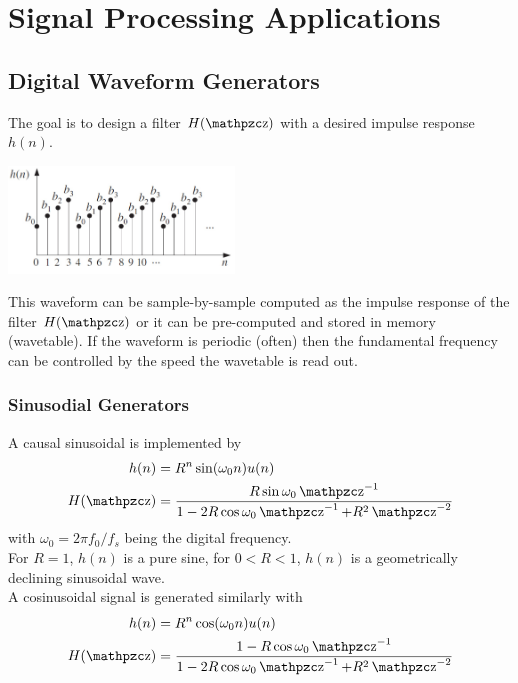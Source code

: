 \section{Signal Processing Applications}
\subsection{Digital Waveform Generators}

The goal is to design a filter $H(\z)$ with a desired impulse response $h(n)$.

\begin{center}
	\includegraphics[width=6cm]{images/SignProcApp_DigWaveFormGenerator.jpg}
\end{center}
This waveform can be sample-by-sample computed as the impulse response of the filter $H(\z)$ or it can be pre-computed and stored in memory (wavetable).
If the waveform is periodic (often) then the fundamental frequency can be controlled by the speed the wavetable is read out.

\subsubsection{Sinusodial Generators}
A causal sinusoidal is implemented by
\begin{align*}
	h(n) &= R^n \sin(\omega_0 n)u(n) \\
	H(\z) &= \frac{R \sin \omega_0 \z^{-1}}{1-2R\cos \omega_0 \z^{-1} + R^2 \z^{-2}}
\end{align*}
with $\omega_0 = 2 \pi f_0 / f_s$ being the digital frequency. \\

For $R=1$, $h(n)$ is a pure sine, for $0<R<1$, $h(n)$ is a geometrically declining sinusoidal wave. \\

A cosinusoidal signal is generated similarly with
\begin{align*}
	h(n) &= R^n \cos(\omega_0 n)u(n) \\
	H(\z) &= \frac{1 - R \cos \omega_0 \z^{-1}}{1-2R\cos \omega_0 \z^{-1} + R^2 \z^{-2}}
\end{align*}


